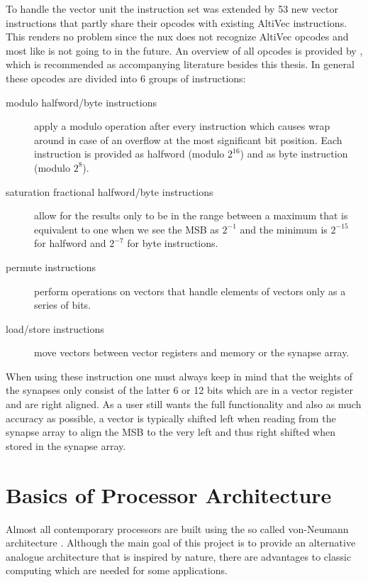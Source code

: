 To handle the vector unit the instruction set was extended by 53 new vector instructions that partly share their opcodes with existing AltiVec instructions.
This renders no problem since the nux does not recognize AltiVec opcodes and most like is not going to in the future.
An overview of all opcodes is provided by \cite{nuxmanual}, which is recommended as accompanying literature besides this thesis.
In general these opcodes are divided into 6 groups of instructions:
\begin{description}
    \item[modulo halfword/byte instructions] apply a modulo operation after every instruction which causes wrap around in case of an overflow at the most significant bit position.
        Each instruction is provided as halfword (modulo $2^{16}$) and as byte instruction (modulo $2^{8}$).
    \item[saturation fractional halfword/byte instructions] allow for the results only to be in the range between a maximum that is equivalent to one when we see the MSB as $2^{-1}$ and the minimum is $2^{-15}$ for halfword and $2^{-7}$ for byte instructions. 
    \item[permute instructions] perform operations on vectors that handle elements of vectors only as a series of bits.
    \item[load/store instructions] move vectors between vector registers and memory or the synapse array.
\end{description}

When using these instruction one must always keep in mind that the weights of the synapses only consist of the latter 6 or 12 bits which are in a vector register and are right aligned.
As a user still wants the full functionality and also as much accuracy as possible, a vector is typically shifted left when reading from the synapse array to  align the MSB to the very left and thus right shifted when stored in the synapse array.


\section{Basics of Processor Architecture}
\label{section:processor}

Almost all contemporary processors are built using the so called von-Neumann architecture .
Although the main goal of this project is to provide an alternative analogue architecture that is inspired by nature, there are advantages to classic computing which are needed for some applications.

